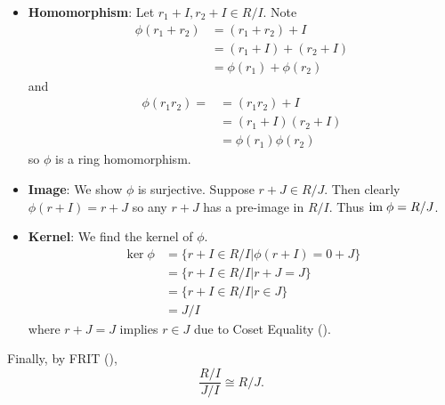 \begin{questions}
\begin{partquestions}{\roman*}
\begin{itemize}
            \item \textbf{Homomorphism}: Let $r_1 + I, r_2 + I \in R/I$. Note
            \begin{align*}
                \phi(r_1+r_2) &= (r_1+r_2) + I\\
                &= (r_1+I) + (r_2+I)\\
                &= \phi(r_1) + \phi(r_2)
            \end{align*}
            and
            \begin{align*}
                \phi(r_1r_2) = &= (r_1r_2) + I\\
                &= (r_1+I)(r_2+I)\\
                &= \phi(r_1)\phi(r_2)
            \end{align*}
            so $\phi$ is a ring homomorphism.

            \item \textbf{Image}: We show $\phi$ is surjective. Suppose $r + J \in R/J$. Then clearly $\phi(r+I) = r+J$ so any $r+J$ has a pre-image in $R/I$. Thus $\mathrm{im}\;\phi = R/J$.

            \item \textbf{Kernel}: We find the kernel of $\phi$.
            \begin{align*}
                \ker\phi &= \{r+I \in R/I \vert \phi(r+I) = 0+J\}\\
                &= \{r+I \in R/I \vert r+J = J\}\\
                &= \{r+I \in R/I \vert r \in J\}\\
                &= J/I
            \end{align*}
            where $r+J=J$ implies $r \in J$ due to Coset Equality ().
        \end{itemize}
        Finally, by FRIT (),
        \[
            \frac{R/I}{J/I} \cong R/J.
        \]
    \end{partquestions}
\end{questions}
